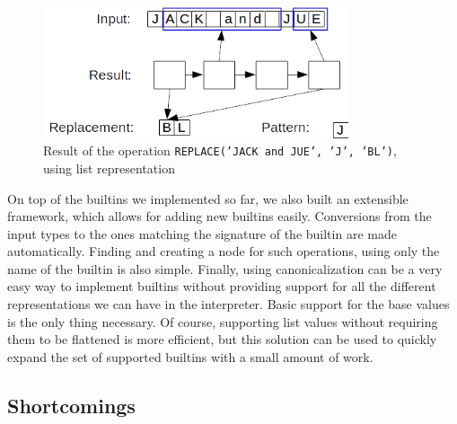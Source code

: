 \documentclass[twoside,11pt,a4paper]{article}
\newcommand{\pls}[1]{\texttt{#1}}
\begin{document}
\begin{figure}[h]
	\centering
	\includegraphics[width=9cm]{./graphs/ReplacementExample.png}
	\caption{Result of the operation \pls{REPLACE('JACK and JUE', 'J', 'BL')}, using list representation}
	\label{fig:replaceexample}
\end{figure}

On top of the builtins we implemented so far, we also built an extensible framework, which allows for adding new builtins easily. Conversions from the input types to the ones matching the signature of the builtin are made automatically. Finding and creating a node for such operations, using only the name of the builtin is also simple. Finally, using canonicalization can be a very easy way to implement builtins without providing support for all the different representations we can have in the interpreter. Basic support for the base values is the only thing necessary. Of course, supporting list values without requiring them to be flattened is more efficient, but this solution can be used to quickly expand the set of supported builtins with a small amount of work.

\subsection{Shortcomings}


\end{document}
